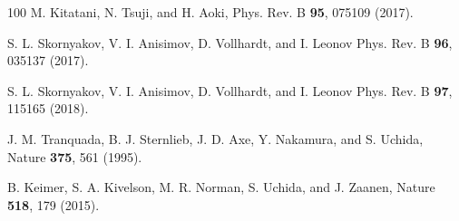 \documentclass[prl,twocolumn,preprintnumbers,superscriptaddress]{revtex4-1}
\begin{document}
\begin{thebibliography}{100}
M. Kitatani, N. Tsuji, and H. Aoki, Phys. Rev. B \textbf{95}, 075109 (2017).


S. L. Skornyakov, V. I. Anisimov, D. Vollhardt, and I. Leonov
Phys. Rev. B \textbf{96}, 035137 (2017).

S. L. Skornyakov, V. I. Anisimov, D. Vollhardt, and I. Leonov
Phys. Rev. B \textbf{97}, 115165 (2018).


J. M. Tranquada, B. J. Sternlieb, J. D. Axe, Y. Nakamura, and S. Uchida, Nature \textbf{375}, 561 (1995).

B. Keimer, S. A. Kivelson, M. R. Norman, S. Uchida, and J. Zaanen, Nature \textbf{518}, 179 (2015).



\end{thebibliography}
\end{document}
